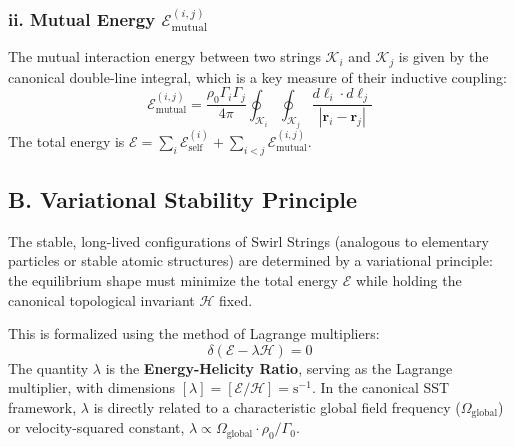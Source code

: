 \documentclass[aps,prb,amsmath,amssymb]{revtex4-2} %
\newcommand{\Hcal}{\mathcal{H}}         %
\begin{document}
            \subsubsection*{ii. Mutual Energy $\mathcal{E}_{\text{mutual}}^{(i,j)}$}
                The mutual interaction energy between two strings $\mathcal{K}_i$ and $\mathcal{K}_j$ is given by the canonical double-line integral, which is a key measure of their inductive coupling:
                \begin{equation}
                    \mathcal{E}_{\text{mutual}}^{(i,j)} = \frac{\rho_0 \Gamma_i \Gamma_j}{4\pi} \oint_{\mathcal{K}_i} \oint_{\mathcal{K}_j} \frac{d\boldsymbol{\ell}_i \cdot d\boldsymbol{\ell}_j}{|\mathbf{r}_i - \mathbf{r}_j|}
                \end{equation}
                The total energy is $\mathcal{E} = \sum_{i} \mathcal{E}_{\text{self}}^{(i)} + \sum_{i<j} \mathcal{E}_{\text{mutual}}^{(i,j)}$.

        \subsection*{B. Variational Stability Principle}
            The stable, long-lived configurations of Swirl Strings (analogous to elementary particles or stable atomic structures) are determined by a variational principle: the equilibrium shape must minimize the total energy $\mathcal{E}$ while holding the canonical topological invariant $\Hcal$ fixed.

            This is formalized using the method of Lagrange multipliers:
            \begin{equation}
                \delta (\mathcal{E} - \lambda \Hcal) = 0
                \label{eq:variational}
            \end{equation}
            The quantity $\lambda$ is the \textbf{Energy-Helicity Ratio}, serving as the Lagrange multiplier, with dimensions $[\lambda] = [\mathcal{E}/\Hcal] = \mathrm{s}^{-1}$. In the canonical SST framework, $\lambda$ is directly related to a characteristic global field frequency ($\Omega_{\text{global}}$) or velocity-squared constant, $\lambda \propto \Omega_{\text{global}} \cdot \rho_0 / \Gamma_0$.
\end{document}
